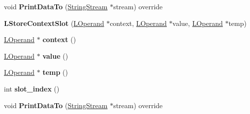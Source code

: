 \begin{DoxyCompactItemize}
\item 
void {\bfseries Print\+Data\+To} (\hyperlink{classv8_1_1internal_1_1_string_stream}{String\+Stream} $\ast$stream) override\hypertarget{classv8_1_1internal_1_1_l_store_context_slot_a559e1a9bb270f10754b7abd4f54768dc}{}\label{classv8_1_1internal_1_1_l_store_context_slot_a559e1a9bb270f10754b7abd4f54768dc}

\item 
{\bfseries L\+Store\+Context\+Slot} (\hyperlink{classv8_1_1internal_1_1_l_operand}{L\+Operand} $\ast$context, \hyperlink{classv8_1_1internal_1_1_l_operand}{L\+Operand} $\ast$value, \hyperlink{classv8_1_1internal_1_1_l_operand}{L\+Operand} $\ast$temp)\hypertarget{classv8_1_1internal_1_1_l_store_context_slot_ac22c1f367afeeac8612b5c3fce152218}{}\label{classv8_1_1internal_1_1_l_store_context_slot_ac22c1f367afeeac8612b5c3fce152218}

\item 
\hyperlink{classv8_1_1internal_1_1_l_operand}{L\+Operand} $\ast$ {\bfseries context} ()\hypertarget{classv8_1_1internal_1_1_l_store_context_slot_a6b072f758dab90336746518191c017e6}{}\label{classv8_1_1internal_1_1_l_store_context_slot_a6b072f758dab90336746518191c017e6}

\item 
\hyperlink{classv8_1_1internal_1_1_l_operand}{L\+Operand} $\ast$ {\bfseries value} ()\hypertarget{classv8_1_1internal_1_1_l_store_context_slot_a0c28014969c34254ff6c3adcac58abbb}{}\label{classv8_1_1internal_1_1_l_store_context_slot_a0c28014969c34254ff6c3adcac58abbb}

\item 
\hyperlink{classv8_1_1internal_1_1_l_operand}{L\+Operand} $\ast$ {\bfseries temp} ()\hypertarget{classv8_1_1internal_1_1_l_store_context_slot_a21856d771e86c39c98d6c66fa824c523}{}\label{classv8_1_1internal_1_1_l_store_context_slot_a21856d771e86c39c98d6c66fa824c523}

\item 
int {\bfseries slot\+\_\+index} ()\hypertarget{classv8_1_1internal_1_1_l_store_context_slot_ae3af6274dd8f0678313b444f513b440d}{}\label{classv8_1_1internal_1_1_l_store_context_slot_ae3af6274dd8f0678313b444f513b440d}

\item 
void {\bfseries Print\+Data\+To} (\hyperlink{classv8_1_1internal_1_1_string_stream}{String\+Stream} $\ast$stream) override\hypertarget{classv8_1_1internal_1_1_l_store_context_slot_a559e1a9bb270f10754b7abd4f54768dc}{}\label{classv8_1_1internal_1_1_l_store_context_slot_a559e1a9bb270f10754b7abd4f54768dc}


\end{DoxyCompactItemize}
